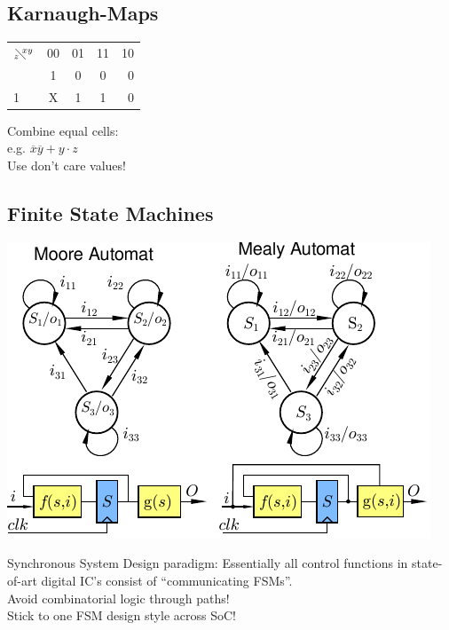 \begin{sectionbox}
    \subsection{Karnaugh-Maps}
	\begin{tabular}{l | c | c |  c | r}
	$_z\!\!\diagdown \!\!^{xy}$ & 00 	& 	01	&	11 	&	10	 	\\ \mrule
	0		&	1 \cellcolor{gray!30}	&	0	&	0	&	0		\\	
	1		&	X \cellcolor{gray!30}	&	1 \cellcolor{lightgray}	&	1 \cellcolor{lightgray}	&	0		\\	
	\end{tabular} \hfil
	\parbox{2.5cm}{
	Combine equal cells:\\
	e.g. $\overline x \overline y + y \cdot z$\\
	Use don't care values!}  
		
\end{sectionbox}


\begin{sectionbox}
    \subsection{Finite State Machines}
	\begin{center}
		\includegraphics[width = 0.9\columnwidth]{./img/automaten.pdf}
	\end{center}
	Synchronous System Design paradigm: Essentially all control functions in state-of-art digital IC's
	consist of “communicating FSMs”.\\
	Avoid combinatorial logic through paths!\\
	Stick to one FSM design style across SoC!\\ 
\end{sectionbox}


